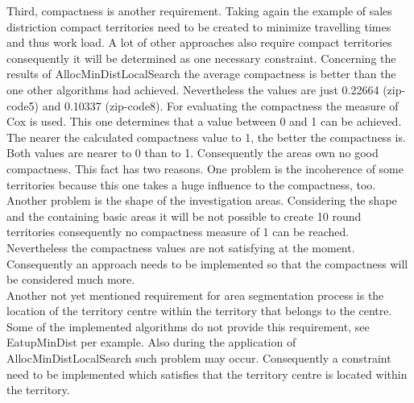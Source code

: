Third, compactness is another requirement. Taking again the example of sales distriction compact territories need to be created to minimize travelling times and thus work load. A lot of other approaches also require compact territories consequently it will be determined as one necessary constraint. Concerning the results of AllocMinDistLocalSearch the average compactness is better than the one other algorithms had achieved. Nevertheless the values are just 0.22664 (zip-code5) and 0.10337 (zip-code8). For evaluating the compactness the measure of Cox is used. This one determines that a value between 0 and 1 can be achieved. The nearer the calculated compactness value to 1, the better the compactness is. Both values are nearer to 0 than to 1. Consequently the areas own no good compactness. This fact has two reasons. One problem is the incoherence of some territories because this one takes a huge influence to the compactness, too. Another problem is the shape of the investigation areas. Considering the shape and the containing basic areas it will be not possible to create 10 round territories consequently no compactness measure of 1 can be reached. Nevertheless the compactness values are not satisfying at the moment. Consequently an approach needs to be implemented so that the compactness will be considered much more. \\
Another not yet mentioned requirement for area segmentation process is the location of the territory centre within the territory that belongs to the centre. Some of the implemented algorithms do not provide this requirement, see EatupMinDist per example. Also during the application of AllocMinDistLocalSearch such problem may occur. Consequently a constraint need to be implemented which satisfies that the territory centre is located within the territory.

